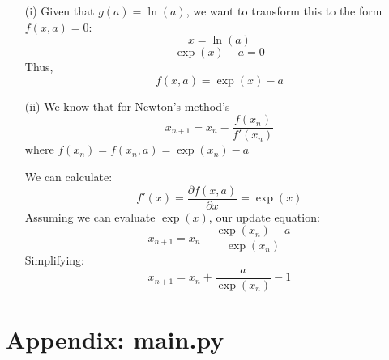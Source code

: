 \documentclass[12pt]{article}
\begin{document}
\begin{enumerate}
\begin{enumerate}
             \item[(i)] Given that $g(a) = \ln(a)$, we want to transform this to the form $f(x,a)=0$:
             $$x = \ln(a)$$
             $$\exp(x) - a = 0$$
             Thus,
             $$f(x, a) = \exp(x) - a$$
  \item[(ii)] We know that for Newton's method's
             $$x_{n+1} = x_{n} - \frac{f(x_n)}{f'(x_n)}$$
             where $f(x_n) = f(x_n, a) = \exp(x_n) - a$

             We can calculate:
             $$f'(x) = \frac{\partial f(x, a)}{\partial x}= \exp(x)$$
             Assuming we can evaluate $\exp(x)$, our update equation:
             $$x_{n+1} = x_{n} - \frac{\exp(x_n) - a}{\exp(x_n)}$$
             Simplifying:
             $$x_{n+1} = x_{n} + \frac{a}{\exp(x_n)} - 1$$
\end{enumerate}


\end{enumerate}
\newpage
\section*{Appendix: main.py}

\end{document}
